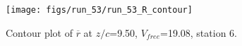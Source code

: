 \begin{figure}[H]
\centering
\texttt{[image: figs/run\_53/run\_53\_R\_contour]}
\caption{Contour plot of $\overline{r}$ at $z/c$=9.50, $V_{free}$=19.08, station 6.}
\end{figure}


